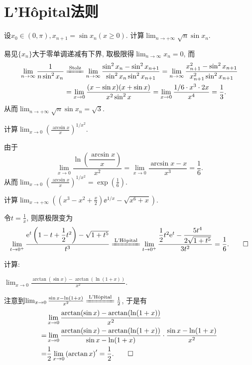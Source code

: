 \section{L'H\^{o}pital法则}
\begin{quiza}
\woe 设\(x_0\in(0,\pi),x_{n+1}=\sin x_n(x\geqslant 0).\) 计算\(\lim_{n\rightarrow+\infty}\sqrt{n}\sin x_n\).
\begin{solution}
易见\(\{x_n\}\)大于零单调递减有下界, 取极限得\(\lim_{n\rightarrow\infty}x_n=0\), 而\[\begin{split}
\lim_{n\rightarrow\infty}\frac{1}{n\sin^2 x_n}&\xlongequal{\text{Stolz}}\lim_{n\rightarrow\infty}\frac{\sin^2x_n-\sin^2x_{n+1}}{\sin^2x_n\sin^2x_{n+1}}=\lim_{n\rightarrow\infty}\frac{x_{n+1}^2-\sin^2x_{n+1}}{x_{n+1}^2\sin^2x_{n+1}}\\&=\lim_{x\rightarrow 0}\frac{(x-\sin x)(x+\sin x)}{x^2\sin^2x}=\lim_{x\rightarrow 0}\frac{1/6\cdot x^3\cdot 2x}{x^4}=\frac{1}{3}.
\end{split}\]从而\(\lim_{n\rightarrow+\infty}\sqrt{n}\sin x_n=\sqrt{3}\).
\end{solution}
\woe 计算\(\lim_{x\rightarrow 0}\left(\frac{\arcsin x}{x}\right)^{1/x^2}\).
\begin{solution}
由于\[\lim_{x\rightarrow 0}\frac{\ln\left(\dfrac{\arcsin x}{x}\right)}{x^2}=\lim_{x\rightarrow 0}\frac{\arcsin x-x}{x^3}=\frac{1}{6}.\]从而\(\lim_{x\rightarrow 0}\left(\frac{\arcsin x}{x}\right)^{1/x^2}=\exp\left(\frac{1}{6}\right)\).
\end{solution}
\woe 计算\(\lim_{x\rightarrow+\infty}\left(\left(x^3-x^2+\frac{x}{2}\right)\ee^{1/x}-\sqrt{x^6+x}\right)\).
\begin{solution}
令\(t=\frac{1}{x}\), 则原极限变为\[\lim_{t\rightarrow0^+}\frac{\ee^t\left(1-t+\dfrac{1}{2}t^2\right)-\sqrt{1+t^5}}{t^3}\xlongequal{\text{L'H\^{o}pital}}\lim_{t\rightarrow 0^+}\frac{\dfrac{1}{2}t^2\ee^t-\dfrac{5t^4}{2\sqrt{1+t^5}}}{3t^2}=\frac{1}{6}.\qedhere\]
\end{solution}
\woe 计算:
\begin{quizs}
\item \(\lim_{x\rightarrow 0}\frac{\arctan(\sin x)-\arctan(\ln (1+x))}{x^2}\).
\begin{solution}
注意到\(\lim_{x\rightarrow 0}\frac{\sin x-\ln(1+x)}{x^2}\xlongequal{\text{L'H\^{o}pital}}\frac{1}{2}\), 于是有\[\begin{split}
&\lim_{x\rightarrow 0}\frac{\arctan(\sin x)-\arctan(\ln (1+x))}{x^2}\\=&\lim_{x\rightarrow 0}\frac{\arctan(\sin x)-\arctan(\ln (1+x))}{\sin x-\ln(1+x)}\cdot\frac{\sin x-\ln(1+x)}{x^2}\\=&\frac{1}{2}\lim_{x\rightarrow 0}\left(\arctan x\right)'=\frac{1}{2}.\qedhere

\end{split}\]
\end{solution}
\end{quizs}
\end{quiza}
